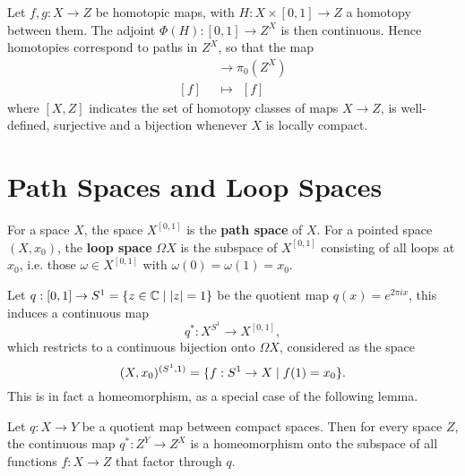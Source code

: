 \begin{example}
Let $f,g:X\to Z$ be homotopic maps, with $H:X\times[0,1]\to Z$ a homotopy between them. The adjoint $\Phi(H):[0,1]\to Z^X$ is then continuous. Hence homotopies correspond to paths in $Z^X$, so that the map
\begin{align*}
[X,Z]&\to\pi_0(Z^X)\\
[f]\ \ &\mapsto\ \ [f]
\end{align*}
where $[X,Z]$ indicates the set of homotopy classes of maps $X\to Z$, is well-defined, surjective and a bijection whenever $X$ is locally compact.
\end{example}

\section{Path Spaces and Loop Spaces}

For a space $X$, the space $X^{[0,1]}$ is the \textbf{path space} of $X$. For a pointed space $(X,x_0)$, the \textbf{loop space} $\Omega X$ is the subspace of $X^{[0,1]}$ consisting of all loops at $x_0$, i.e. those $\omega\in X^{[0,1]}$ with $\omega(0)=\omega(1)=x_0$.

Let $q:[0,1]\to S^1=\{z\in\mathbb{C}\mid|z|=1\}$ be the quotient map $q(x)=e^{2\pi ix}$, this induces a continuous map
\[q^*:X^{S^1}\to X^{[0,1]},\]
which restricts to a continuous bijection onto $\Omega X$, considered as the space
\[(X,x_0)^{(S^1,1)}=\{f:S^1\to X\mid f(1)=x_0\}.\]
This is in fact a homeomorphism, as a special case of the following lemma.

\begin{lemma}\label{lemma:quotient-map-induces-homeomorphism-on-mapping-spaces}
Let $q:X\to Y$ be a quotient map between compact spaces. Then for every space $Z$, the continuous map $q^*:Z^Y\to Z^X$ is a homeomorphism onto the subspace of all functions $f:X\to Z$ that factor through $q$.
\end{lemma}
